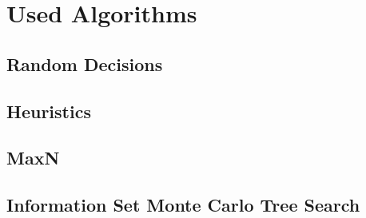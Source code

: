 \chapter{Used Algorithms}

\section{Random Decisions}

\section{Heuristics}

\section{MaxN}

\section{Information Set Monte Carlo Tree Search}
